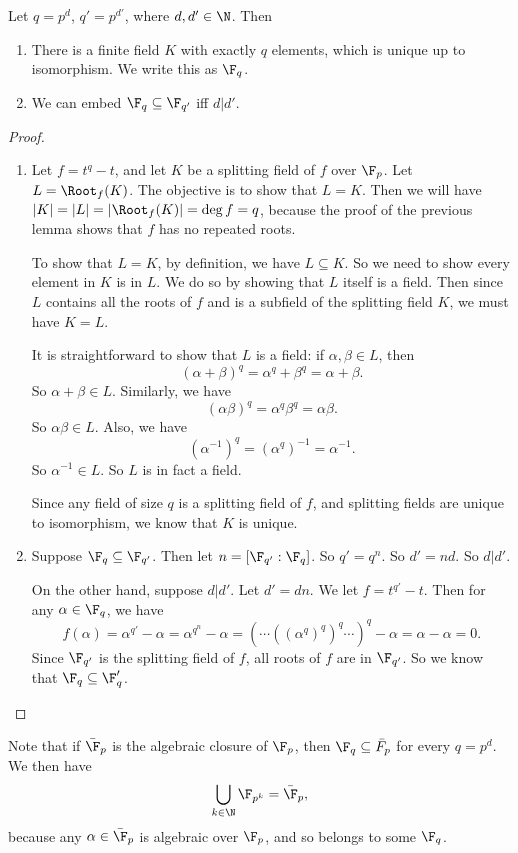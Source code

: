 \documentclass[a4paper]{article}
\begin{document}
\begin{lemma}
  Let $q = p^d$, $q' = p^{d'}$, where $d, d' \in \N$. Then
  \begin{enumerate}
    \item There is a finite field $K$ with exactly $q$ elements, which is unique up to isomorphism. We write this as $\F_q$.
    \item We can embed $\F_q \subseteq \F_{q'}$ iff $d | d'$.
  \end{enumerate}
\end{lemma}

\begin{proof}\leavevmode
  \begin{enumerate}
    \item Let $f = t^q - t$, and let $K$ be a splitting field of $f$ over $\F_p$. Let $L = \Root_f(K)$. The objective is to show that $L = K$. Then we will have $|K| = |L| = |\Root_f(K)| = \deg f = q$, because the proof of the previous lemma shows that $f$ has no repeated roots.

      To show that $L = K$, by definition, we have $L \subseteq K$. So we need to show every element in $K$ is in $L$. We do so by showing that $L$ itself is a field. Then since $L$ contains all the roots of $f$ and is a subfield of the splitting field $K$, we must have $K = L$.

      It is straightforward to show that $L$ is a field: if $\alpha, \beta \in L$, then
      \[
        (\alpha + \beta)^q  = \alpha^q + \beta^q = \alpha + \beta.
      \]
      So $\alpha + \beta \in L$. Similarly, we have
      \[
        (\alpha\beta)^q = \alpha^q \beta^q = \alpha\beta.
      \]
      So $\alpha\beta \in L$. Also, we have
      \[
        (\alpha^{-1})^q = (\alpha^q)^{-1} = \alpha^{-1}.
      \]
      So $\alpha^{-1} \in L$. So $L$ is in fact a field.

      Since any field of size $q$ is a splitting field of $f$, and splitting fields are unique to isomorphism, we know that $K$ is unique.
    \item Suppose $\F_q \subseteq \F_{q'}$. Then let $n = [\F_{q'}: \F_q]$. So $q' = q^n$.  So $d'= nd$. So $d | d'$.

      On the other hand, suppose $d | d'$. Let $d' = dn$. We let $f = t^{q'} - t$. Then for any $\alpha \in \F_q$, we have
      \[
        f(\alpha) = \alpha^{q'} - \alpha = \alpha^{q^n} - \alpha = (\cdots ((\alpha^q)^q)^q\cdots )^q - \alpha = \alpha - \alpha = 0.
      \]
      Since $\F_{q'}$ is the splitting field of $f$, all roots of $f$ are in $\F_{q'}$. So we know that $\F_q \subseteq \F_q'$.
  \end{enumerate}
\end{proof}
Note that if $\bar{\F}_p$ is the algebraic closure of $\F_p$, then $\F_q \subseteq \bar{F}_p$ for every $q = p^d$. We then have
\[
  \bigcup_{k \in \N} \F_{p^k} = \bar{\F}_p,
\]
because any $\alpha \in \bar{\F}_p$ is algebraic over $\F_p$, and so belongs to some $\F_q$.
\end{document}
